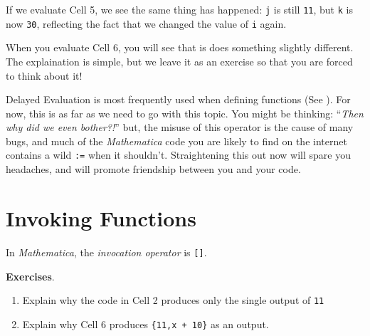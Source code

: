 If we evaluate Cell 5, we see the same thing has happened: \texttt{j} is still \texttt{11}, but \texttt{k} is now \texttt{30}, reflecting the fact that we changed the value of \texttt{i} again.

When you evaluate Cell 6, you will see that is does something slightly different. The explaination is simple, but we leave it as an exercise so that you are forced to think about it!

Delayed Evaluation is most frequently used when defining functions (See ). For now, this is as far as we need to go with this topic. You might be thinking: ``\emph{Then why did we even bother?!}'' but, the misuse of this operator is the cause of many bugs, and much of the \emph{Mathematica} code you are likely to find on the internet contains a wild \texttt{:=} when it shouldn't. Straightening this out now will spare you headaches, and will promote friendship between you and your code.

\section{Invoking Functions}

In \emph{Mathematica}, the \emph{invocation operator} is \texttt{[]}. 

{\bf Exercises}. 
\begin{enumerate}
	   \item Explain why the code in Cell 2 produces only the single output of \texttt{11}
	   \item Explain why Cell 6 produces \texttt{\{11,x + 10\}} as an output.
\end{enumerate}

